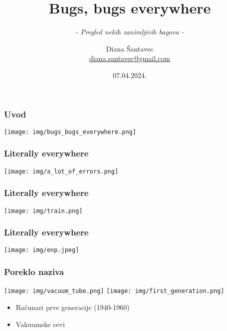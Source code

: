 \documentclass{beamer}
\title{Bugs, bugs everywhere}
\subtitle[]{\textit{ - Pregled nekih zanimljivih bagova -}}
\author[Diana Šantavec]{Diana Šantavec \\ \small \url{diana.santavec@gmail.com}}
\institute{Istraživačka stanica Petnica}
\date{07.04.2024.}
\begin{document}
\frame{\titlepage}


\begin{frame}
\frametitle{Uvod}
\begin{center}
    \texttt{[image: img/bugs\_bugs\_everywhere.png]}
\end{center}
\end{frame}


\begin{frame}
    \frametitle{Literally everywhere}
    \begin{center}
        \texttt{[image: img/a\_lot\_of\_errors.png]}
    \end{center}
\end{frame}

\begin{frame}
    \frametitle{Literally everywhere}
    \begin{center}
        \texttt{[image: img/train.png]}
    \end{center}
\end{frame}

\begin{frame}
    \frametitle{Literally everywhere}
    \begin{center}
        \texttt{[image: img/enp.jpeg]}
    \end{center}
\end{frame}


\begin{frame}
    \frametitle{Poreklo naziva}
    \begin{center}
        \texttt{[image: img/vacuum\_tube.png]}
        \texttt{[image: img/first\_generation.png]}
    \end{center}
    \begin{itemize}
        \item Računari prve generacije (1940-1960) \newline
        \item Vakuumske cevi
    \end{itemize}
\end{frame}
\end{document}
